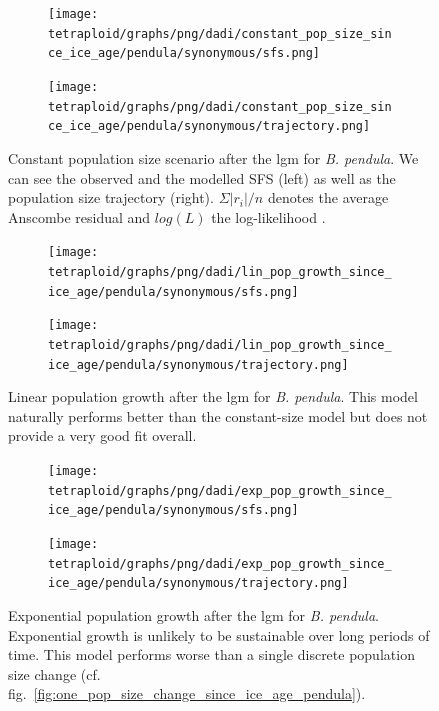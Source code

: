 \documentclass[hidelinks,11pt]{article}
\newcommand{\pendula}{\textit{B. pendula}}
\begin{document}
    \begin{figure}[H]
        \centering
        \begin{subfigure}[b]{0.465\textwidth}
            \texttt{[image: tetraploid/graphs/png/dadi/constant\_pop\_size\_since\_ice\_age/pendula/synonymous/sfs.png]}
        \end{subfigure}
        \hfill
        \begin{subfigure}[b]{0.525\textwidth}
            \texttt{[image: tetraploid/graphs/png/dadi/constant\_pop\_size\_since\_ice\_age/pendula/synonymous/trajectory.png]}
        \end{subfigure}
        \caption{Constant population size scenario after the \acrshort{lgm} for \pendula{}. We can see the observed and the modelled SFS (left) as well as the population size trajectory (right). $\Sigma |r_i|/n$ denotes the average Anscombe residual and $log(L)$ the log-likelihood \cite{dadi-docs}.}
        \label{fig:constant_pop_size_since_ice_age_pendula}
    \end{figure}

    \begin{figure}[H]
        \centering
        \begin{subfigure}[b]{0.465\textwidth}
            \texttt{[image: tetraploid/graphs/png/dadi/lin\_pop\_growth\_since\_ice\_age/pendula/synonymous/sfs.png]}
        \end{subfigure}
        \hfill
        \begin{subfigure}[b]{0.525\textwidth}
            \texttt{[image: tetraploid/graphs/png/dadi/lin\_pop\_growth\_since\_ice\_age/pendula/synonymous/trajectory.png]}
        \end{subfigure}
        \caption{Linear population growth after the \acrshort{lgm} for \pendula{}. This model naturally performs better than the constant-size model but does not provide a very good fit overall.}
        \label{fig:lin_pop_growth_since_ice_age_pendula}
    \end{figure}

    \begin{figure}[H]
        \centering
        \begin{subfigure}[b]{0.465\textwidth}
            \texttt{[image: tetraploid/graphs/png/dadi/exp\_pop\_growth\_since\_ice\_age/pendula/synonymous/sfs.png]}
        \end{subfigure}
        \hfill
        \begin{subfigure}[b]{0.525\textwidth}
            \texttt{[image: tetraploid/graphs/png/dadi/exp\_pop\_growth\_since\_ice\_age/pendula/synonymous/trajectory.png]}
        \end{subfigure}
        \caption{Exponential population growth after the \acrshort{lgm} for \pendula{}. Exponential growth is unlikely to be sustainable over long periods of time. This model performs worse than a single discrete population size change (cf. fig.~\ref{fig:one_pop_size_change_since_ice_age_pendula}).}
        \label{fig:exp_pop_growth_since_ice_age_pendula}
    \end{figure}
\end{document}
